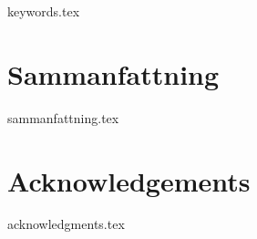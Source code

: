 %

\maketitle
\thispagestyle{empty}
\clearpage{\pagestyle{empty}\cleardoublepage}


%
\noindent
\begin{minipage}{\linewidth - 30pt}
  \vspace*{-6pt}
  \begin{abstract}
    \thispagestyle{plain}          %
    \vspace*{6pt}
    \setlength{\parskip}{1em}
    {abstract.tex}
  \end{abstract}

  \begin{keywords}
    {keywords.tex}
  \end{keywords}
\end{minipage}
\cleardoublepage

%

\chapter*{Sammanfattning}
\thispagestyle{plain}
%
{sammanfattning.tex}
\cleardoublepage

%
\chapter*{Acknowledgements}
\thispagestyle{plain}
%
{acknowledgments.tex}
\cleardoublepage

%
\tableofcontents
\thispagestyle{plain}
\cleardoublepage

%

\listoffigures
\cleardoublepage

%

\listoftables
\cleardoublepage